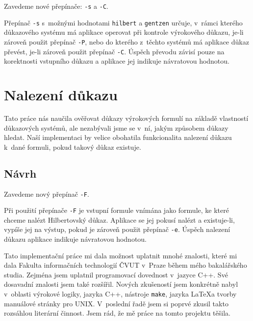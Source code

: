 \documentclass[thesis=B,czech,hidelinks]{FITthesis}[2012/06/26]
\begin{document}
Zavedeme nové přepínače: \texttt{-s} a \texttt{-C}.

Přepínač \texttt{-s} s~možnými hodnotami \texttt{hilbert} a \texttt{gentzen} určuje, v~rámci kterého důkazového systému má aplikace operovat při kontrole výrokového důkazu, je-li zároveň použit přepínač \texttt{-P}, nebo do kterého z~těchto systémů má aplikace důkaz převést, je-li zároveň použit přepínač \texttt{-C}. Úspěch převodu závisí pouze na korektnosti vstupního důkazu a aplikace jej indikuje návratovou hodnotou.

\section{Nalezení důkazu}

Tato práce nás naučila ověřovat důkazy výrokových formulí na základě vlastností důkazových systémů, ale nezabývali jsme se v~ní, jakým způsobem důkazy hledat. Naší implementaci by velice obohatila funkcionalita nalezení důkazu k~dané formuli, pokud takový důkaz existuje.

\subsection{Návrh}

Zavedeme nový přepínač \texttt{-F}.

Při použití přepínače \texttt{-F} je vstupní formule vnímána jako formule, ke které chceme nalézt Hilbertovský důkaz. Aplikace se jej pokusí nalézt a existuje-li, vypíše jej na výstup, pokud je zároveň použit přepínač \texttt{-e}. Úspěch nalezení důkazu aplikace indikuje návratovou hodnotou.

%
%
%

\begin{conclusion}
Tato implementační práce mi dala možnost uplatnit mnohé znalosti, které mi dala Fakulta informačních technologií ČVUT v~Praze během mého bakalářského studia. Zejména jsem uplatnil programovací dovednost v~jazyce C++. Své dosavadní znalosti jsem také rozšířil. Nových zkušeností jsem konkrétně nabyl v~oblasti výrokové logiky, jazyka C++, nástroje \texttt{make}, jazyka \LaTeX a tvorby manuálové stránky pro UNIX. V~poslední řadě jsem si poprvé zkusil takto rozsáhlou literární činnost. Jsem rád, že mě práce na tomto projektu těšila.
\end{conclusion}

%
%
%



\end{document}
